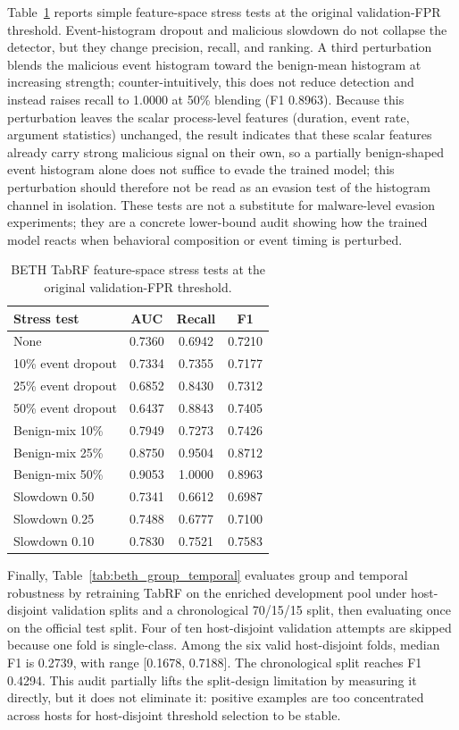 \documentclass[10pt,journal,compsoc]{IEEEtran}
\begin{document}
Table~\ref{tab:beth_stress} reports simple feature-space stress tests at the original validation-FPR threshold. Event-histogram dropout and malicious slowdown do not collapse the detector, but they change precision, recall, and ranking. A third perturbation blends the malicious event histogram toward the benign-mean histogram at increasing strength; counter-intuitively, this does not reduce detection and instead raises recall to 1.0000 at 50\% blending (F1 0.8963). Because this perturbation leaves the scalar process-level features (duration, event rate, argument statistics) unchanged, the result indicates that these scalar features already carry strong malicious signal on their own, so a partially benign-shaped event histogram alone does not suffice to evade the trained model; this perturbation should therefore not be read as an evasion test of the histogram channel in isolation. These tests are not a substitute for malware-level evasion experiments; they are a concrete lower-bound audit showing how the trained model reacts when behavioral composition or event timing is perturbed.

\begin{table}[t]
\centering
\caption{BETH TabRF feature-space stress tests at the original validation-FPR threshold.}
\label{tab:beth_stress}
\begin{tabular}{lccc}
\toprule
\textbf{Stress test} & \textbf{AUC} & \textbf{Recall} & \textbf{F1} \\
\midrule
None & 0.7360 & 0.6942 & 0.7210 \\
10\% event dropout & 0.7334 & 0.7355 & 0.7177 \\
25\% event dropout & 0.6852 & 0.8430 & 0.7312 \\
50\% event dropout & 0.6437 & 0.8843 & 0.7405 \\
Benign-mix 10\% & 0.7949 & 0.7273 & 0.7426 \\
Benign-mix 25\% & 0.8750 & 0.9504 & 0.8712 \\
Benign-mix 50\% & 0.9053 & 1.0000 & 0.8963 \\
Slowdown 0.50 & 0.7341 & 0.6612 & 0.6987 \\
Slowdown 0.25 & 0.7488 & 0.6777 & 0.7100 \\
Slowdown 0.10 & 0.7830 & 0.7521 & 0.7583 \\
\bottomrule
\end{tabular}
\end{table}

Finally, Table~\ref{tab:beth_group_temporal} evaluates group and temporal robustness by retraining TabRF on the enriched development pool under host-disjoint validation splits and a chronological 70/15/15 split, then evaluating once on the official test split. Four of ten host-disjoint validation attempts are skipped because one fold is single-class. Among the six valid host-disjoint folds, median F1 is 0.2739, with range [0.1678, 0.7188]. The chronological split reaches F1 0.4294. This audit partially lifts the split-design limitation by measuring it directly, but it does not eliminate it: positive examples are too concentrated across hosts for host-disjoint threshold selection to be stable.
\end{document}
